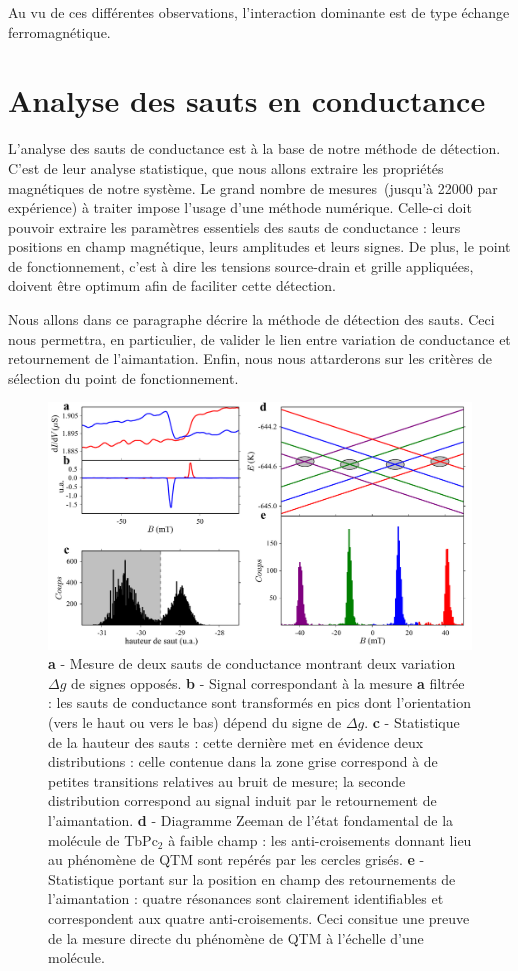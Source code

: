 Au vu de ces différentes observations, l'interaction dominante est de type échange ferromagnétique.

\section{Analyse des sauts en conductance}
L'analyse des sauts de conductance est à la base de notre méthode de détection. C'est de leur analyse statistique, que nous allons extraire les propriétés magnétiques de notre système. Le grand nombre de mesures~(jusqu'à 22000 par expérience) à traiter impose l'usage d'une méthode numérique. Celle-ci doit pouvoir extraire les paramètres essentiels des sauts de conductance : leurs positions en champ magnétique, leurs amplitudes et leurs signes. De plus, le point de fonctionnement, c'est à dire les tensions source-drain et grille appliquées, doivent être optimum afin de faciliter cette détection. 

Nous allons dans ce paragraphe décrire la méthode de détection des sauts. Ceci nous permettra, en particulier, de valider le lien entre variation de conductance et retournement de l'aimantation. Enfin, nous nous attarderons sur les critères de sélection du point de fonctionnement.

\begin{figure}
\includegraphics[scale=0.45]{Resultats/CondJump/CondJump.pdf} 
\caption{\textbf{a} - Mesure de deux sauts de conductance montrant deux variation $\Delta g$ de signes opposés. \textbf{b} - Signal correspondant à la mesure \textbf{a} filtrée : les sauts de conductance sont transformés en pics dont l'orientation (vers le haut ou vers le bas) dépend du signe de $\Delta g$. \textbf{c} - Statistique de la hauteur des sauts : cette dernière met en évidence deux distributions : celle contenue dans la zone grise correspond à de petites transitions relatives au bruit de mesure; la seconde distribution correspond au signal induit par le retournement de l'aimantation. \textbf{d} - Diagramme Zeeman de l'état fondamental de la molécule de TbPc$_2$ à faible champ : les anti-croisements donnant lieu au phénomène de QTM sont repérés par les cercles grisés. \textbf{e} - Statistique portant sur la position en champ des retournements de l'aimantation : quatre résonances sont clairement identifiables et correspondent aux quatre anti-croisements. Ceci consitue une preuve de la mesure directe du phénomène de QTM à l'échelle d'une molécule.}
\label{analyse_saut}
\end{figure}


